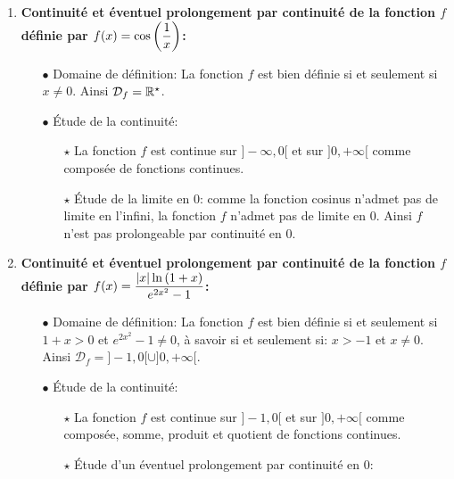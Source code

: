 \documentclass[a4paper, 11pt,reqno]{article}
\begin{document}
\begin{correction}   \;
	\begin{enumerate}
		\item \textbf{Continuit\'e et \'eventuel prolongement par continuit\'e de la fonction $f$ d\'efinie par $f(x)=\cos{\left(\displaystyle\frac{1}{x}  \right)}$:}
		      \begin{itemize}
			      \item[$\bullet$] Domaine de d\'efinition: La fonction $f$ est bien d\'efinie si et seulement si $x\not= 0$. Ainsi $\mathcal{D}_{f}=\mathbb{R}^{\star}$.
			      \item[$\bullet$] \'Etude de la continuit\'e:
			            \begin{itemize}
				            \item[$\star$] La fonction $f$ est continue sur $\rbrack -\infty,0\lbrack$ et sur $\rbrack 0,+\infty\lbrack$ comme compos\'ee de fonctions continues.
				            \item[$\star$] \'Etude de la limite en 0: comme la fonction cosinus n'admet pas de limite en l'infini, la fonction $f$ n'admet pas de limite en 0. Ainsi $f$ n'est pas prolongeable par continuit\'e en 0.
			            \end{itemize}
		      \end{itemize}
		\item \textbf{Continuit\'e et \'eventuel prolongement par continuit\'e de la fonction $f$ d\'efinie par $f(x)=\displaystyle\frac{|x| \ln{(1+x)}}{e^{2x^2}-1}$:}
		      \begin{itemize}
			      \item[$\bullet$] Domaine de d\'efinition: La fonction $f$ est bien d\'efinie si et seulement si $1+x>0$ et $e^{2x^2}-1\not= 0$, \`{a} savoir si et seulement si: $x>-1$ et $x\not= 0$. Ainsi $\mathcal{D}_{f}=\rbrack -1,0\lbrack\cup\rbrack 0,+\infty\lbrack$.
			      \item[$\bullet$] \'Etude de la continuit\'e:
			            \begin{itemize}
				            \item[$\star$] La fonction $f$ est continue sur $\rbrack -1,0\lbrack$ et sur $\rbrack 0,+\infty\lbrack$ comme compos\'ee, somme, produit et quotient de fonctions continues.
				            \item[$\star$] \'Etude d'un \'eventuel prolongement par continuit\'e en 0:\\

\end{itemize}
\end{itemize}
\end{enumerate}
\end{correction}
\end{document}
